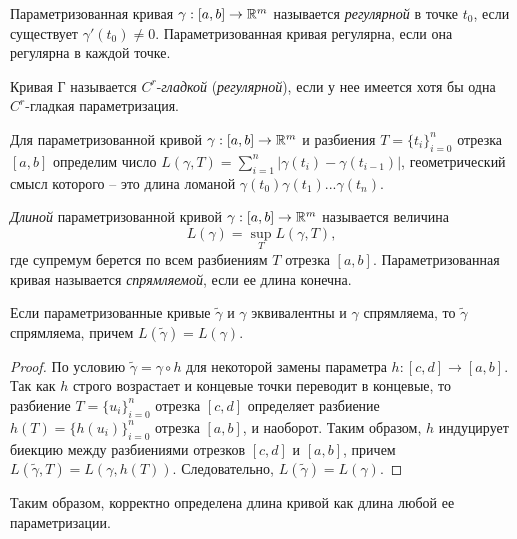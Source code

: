 \begin{definition}
    Параметризованная кривая $\gamma: [a, b] \to \mathbb{R}^m$ называется \textit{регулярной} в точке $t_{0}$, если существует $\gamma'(t_{0}) \neq 0$. Параметризованная кривая регулярна, если она регулярна в каждой точке.
\end{definition}

\begin{definition}
    Кривая Г называется $C^{r}$-\textit{гладкой} (\textit{регулярной}), если у нее имеется хотя бы одна $C^{r}$-гладкая параметризация.
\end{definition}

Для параметризованной кривой $\gamma: [a, b] \to \mathbb{R}^m$ и разбиения $T = \{t_{i}\}_{i=0}^{n}$ отрезка $[a, b]$ определим число $L(\gamma, T) = \sum_{i=1}^{n} |\gamma(t_{i}) - \gamma(t_{i-1})|$, геометрический смысл которого -- это длина ломаной $\gamma(t_{0})\gamma(t_{1})...\gamma(t_{n})$.

\begin{definition}
    \textit{Длиной} параметризованной кривой $\gamma: [a, b] \to \mathbb{R}^m$ называется величина 
    \[L(\gamma) = \sup_{T}L(\gamma, T),\]
    где супремум берется по всем разбиениям $T$ отрезка $[a ,b]$. Параметризованная кривая называется \textit{спрямляемой}, если ее длина конечна.
\end{definition}

\begin{lemma}
    Если параметризованные кривые $\tilde\gamma$ и $\gamma$ эквивалентны и $\gamma$ спрямляема, то $\tilde\gamma$ спрямляема, причем $L(\tilde\gamma) = L(\gamma)$.
\end{lemma}

\begin{proof}
    По условию $\tilde\gamma = \gamma \circ h$ для некоторой замены параметра $h: [c, d] \to [a, b]$. Так как $h$ строго возрастает и концевые точки переводит в концевые, то разбиение $T = \{u_{i}\}_{i = 0}^{n}$ отрезка $[c, d]$ определяет разбиение $h(T) = \{h(u_{i})\}_{i = 0}^{n}$ отрезка $[a, b]$, и наоборот. Таким образом, $h$ индуцирует биекцию между разбиениями отрезков $[c, d]$ и $[a, b]$, причем $L(\tilde\gamma, T) = L(\gamma, h(T))$. Следовательно, $L(\tilde\gamma) = L(\gamma)$.
\end{proof}

\begin{note}
    Таким образом, корректно определена длина кривой как длина любой ее параметризации.
\end{note}

